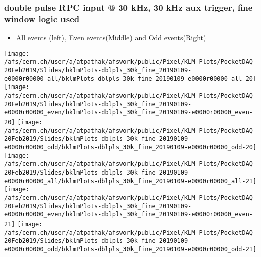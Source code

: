 \documentclass{beamer}
\begin{document}
\begin{frame}
\frametitle{\small double pulse RPC input @ 30 kHz, 30 kHz aux trigger, fine window logic used}
\vspace*{.05cm}
\begin{center}
 \begin{itemize}
\item { \small All events (left), Even events(Middle) and Odd events(Right)}
\end{itemize}
\begin{normalsize}

\vspace*{-.2cm}
\begin{center}

\texttt{[image: /afs/cern.ch/user/a/atpathak/afswork/public/Pixel/KLM\_Plots/PocketDAQ\_20Feb2019/Slides/bklmPlots-dblpls\_30k\_fine\_20190109-e0000r00000\_all/bklmPlots-dblpls\_30k\_fine\_20190109-e0000r00000\_all-20]}
\texttt{[image: /afs/cern.ch/user/a/atpathak/afswork/public/Pixel/KLM\_Plots/PocketDAQ\_20Feb2019/Slides/bklmPlots-dblpls\_30k\_fine\_20190109-e0000r00000\_even/bklmPlots-dblpls\_30k\_fine\_20190109-e0000r00000\_even-20]}
\texttt{[image: /afs/cern.ch/user/a/atpathak/afswork/public/Pixel/KLM\_Plots/PocketDAQ\_20Feb2019/Slides/bklmPlots-dblpls\_30k\_fine\_20190109-e0000r00000\_odd/bklmPlots-dblpls\_30k\_fine\_20190109-e0000r00000\_odd-20]} \\

\texttt{[image: /afs/cern.ch/user/a/atpathak/afswork/public/Pixel/KLM\_Plots/PocketDAQ\_20Feb2019/Slides/bklmPlots-dblpls\_30k\_fine\_20190109-e0000r00000\_all/bklmPlots-dblpls\_30k\_fine\_20190109-e0000r00000\_all-21]}
\texttt{[image: /afs/cern.ch/user/a/atpathak/afswork/public/Pixel/KLM\_Plots/PocketDAQ\_20Feb2019/Slides/bklmPlots-dblpls\_30k\_fine\_20190109-e0000r00000\_even/bklmPlots-dblpls\_30k\_fine\_20190109-e0000r00000\_even-21]}
\texttt{[image: /afs/cern.ch/user/a/atpathak/afswork/public/Pixel/KLM\_Plots/PocketDAQ\_20Feb2019/Slides/bklmPlots-dblpls\_30k\_fine\_20190109-e0000r00000\_odd/bklmPlots-dblpls\_30k\_fine\_20190109-e0000r00000\_odd-21]} \\

\end{center}
\end{normalsize}
\end{center}
\end{frame}
\end{document}
